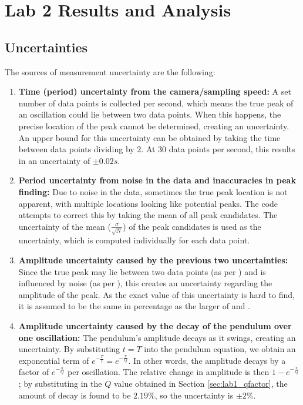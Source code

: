 \documentclass[aps,twocolumn,secnumarabic,nobalancelastpage,amsmath,amssymb,nofootinbib,floatfix,letterpaper]{revtex4}
\begin{document}

\section{Lab 2 Results and Analysis}

\subsection{Uncertainties}
\label{sec:lab2_uncertainties}

The sources of measurement uncertainty are the following:
\begin{enumerate}
    \item
        \textbf{Time (period) uncertainty from the camera/sampling speed:} A set number of data points is collected per
        second, which means the true peak of an oscillation could lie between two data points. When this happens, the
        precise location of the peak cannot be determined, creating an uncertainty. An upper bound for this uncertainty
        can be obtained by taking the time between data points dividing by 2. At 30 data points per second, this results
        in an uncertainty of \(\pm 0.02\si{s}\).
    \item
        \textbf{Period uncertainty from noise in the data and inaccuracies in peak finding:} Due to noise in the data,
        sometimes the true peak location is not apparent, with multiple locations looking like potential peaks. The code
        attempts to correct this by taking the mean of all peak candidates. The uncertainty of the mean
        (\(\frac{\sigma}{\sqrt{N}}\)) of the peak candidates is used as the uncertainty, which is computed individually
        for each data point.
    \item
        \textbf{Amplitude uncertainty caused by the previous two uncertainties:} Since the true peak may lie between two data
        points (as per ) and is influenced by noise (as per ), this creates an
        uncertainty regarding the amplitude of the peak. As the exact value of this uncertainty is hard to find, it is
        assumed to be the same in percentage as the larger of  and .
    \item
        \textbf{Amplitude uncertainty caused by the decay of the pendulum over one oscillation:} The pendulum's
        amplitude decays as it swings, creating an uncertainty. By substituting \(t = T\) into the pendulum equation, we
        obtain an exponential term of \(e^{-\frac{T}{t}} = e^{-\frac{\pi}{Q}}\). In other words, the amplitude decays by
        a factor of \(e^{-\frac{\pi}{Q}}\) per oscillation. The relative change in amplitude is then
        \(1 - e^{-\frac{\pi}{Q}}\); by substituting in the \(Q\) value obtained in Section \ref{sec:lab1_qfactor}, the
        amount of decay is found to be \(2.19\%\), so the uncertainty is \(\pm 2\%\).
\end{enumerate}
\end{document}
